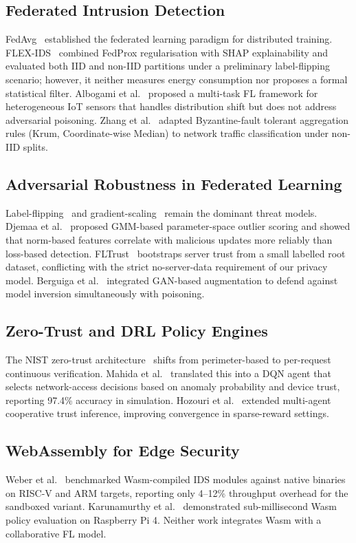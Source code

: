 \documentclass[iicol,sn-mathphys,Numbered]{sn-jnl}
\begin{document}
\subsection{Federated Intrusion Detection}
FedAvg~\cite{mcmahan2017} established the federated learning paradigm for distributed training. FLEX-IDS~\cite{flexids} combined FedProx regularisation with SHAP explainability and evaluated both IID and non-IID partitions under a preliminary label-flipping scenario; however, it neither measures energy consumption nor proposes a formal statistical filter. Albogami et al.~\cite{albogami2025} proposed a multi-task FL framework for heterogeneous IoT sensors that handles distribution shift but does not address adversarial poisoning. Zhang et al.~\cite{zhang2025} adapted Byzantine-fault tolerant aggregation rules (Krum, Coordinate-wise Median) to network traffic classification under non-IID splits.

\subsection{Adversarial Robustness in Federated Learning}
Label-flipping~\cite{tolpegin2020} and gradient-scaling~\cite{bagdasaryan2020} remain the dominant threat models. Djemaa et al.~\cite{djemaa2026} proposed GMM-based parameter-space outlier scoring and showed that norm-based features correlate with malicious updates more reliably than loss-based detection. FLTrust~\cite{cao2022} bootstraps server trust from a small labelled root dataset, conflicting with the strict no-server-data requirement of our privacy model. Berguiga et al.~\cite{berguiga2025} integrated GAN-based augmentation to defend against model inversion simultaneously with poisoning.

\subsection{Zero-Trust and DRL Policy Engines}
The NIST zero-trust architecture~\cite{rose2020} shifts from perimeter-based to per-request continuous verification. Mahida et al.~\cite{mahida2026} translated this into a DQN agent that selects network-access decisions based on anomaly probability and device trust, reporting 97.4\% accuracy in simulation. Hozouri et al.~\cite{hozouri2025} extended multi-agent cooperative trust inference, improving convergence in sparse-reward settings.

\subsection{WebAssembly for Edge Security}
Weber et al.~\cite{weber2026} benchmarked Wasm-compiled IDS modules against native binaries on RISC-V and ARM targets, reporting only 4--12\% throughput overhead for the sandboxed variant. Karunamurthy et al.~\cite{karunamurthy2025} demonstrated sub-millisecond Wasm policy evaluation on Raspberry Pi 4. Neither work integrates Wasm with a collaborative FL model.
\end{document}
